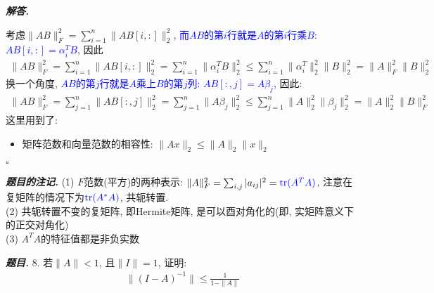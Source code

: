 \documentclass[10pt, a4paper, oneside]{ctexart}
\newcommand{\norm}[1]{\| #1 \|}
\newenvironment{problem}{\begin{framed}\par\noindent\textbf{\textit{题目. }}}{\end{framed}\par}
\newenvironment{solution}{%
  \par\noindent\textbf{\textit{解答. }}\ignorespaces
}{%
  \hfill\ensuremath{\square}\par %
}
\newenvironment{note}{\par\noindent\textbf{\textit{题目的注记. }}\ignorespaces}{\par}
\begin{document}
\begin{solution}
考虑$\norm{AB}_F^2=\sum_{i=1}^n \norm{AB[i,:]}_2^2$, \textcolor{blue}{而$AB$的第$i$行就是$A$的第$i$行乘$B$: $AB[i,:]=\alpha_i^TB$}, 因此
\begin{align*}
    \norm{AB}_F^2=\sum_{i=1}^n \norm{AB[i,:]}_2^2=\sum_{i=1}^n \norm{\alpha_i^TB}_2^2\leq \sum_{i=1}^n \norm{\alpha_i^T}_2^2\norm{B}_2^2=\norm{A}_F^2\norm{B}_2^2
\end{align*}
换一个角度, \textcolor{blue}{$AB$的第$j$行就是$A$乘上$B$的第$j$列: $AB[:,j]=A\beta_j$}, 因此:
\begin{align*}
    \norm{AB}_F^2=\sum_{j=1}^n \norm{AB[:,j]}_2^2=\sum_{j=1}^n \norm{A\beta_j}_2^2\leq \sum_{j=1}^n \norm{A}_2^2\norm{\beta_j}_2^2=\norm{A}_2^2\norm{B}_F^2
\end{align*}
这里用到了:
\begin{itemize}
    \item 矩阵范数和向量范数的相容性: $\norm{Ax}_2\leq \norm{A}_2\norm{x}_2$
\end{itemize}
\end{solution}

\begin{note}
(1) $F$范数(平方)的两种表示: $\norm{A}_F^2=\sum_{i,j}|a_{ij}|^2=\textcolor{blue}{\text{tr}(A^TA) }$, 注意在复矩阵的情况下为$\textcolor{blue}{\text{tr}(A^*A)}$, 共轭转置.\\
(2) 共轭转置不变的复矩阵, 即Hermite矩阵, 是可以酉对角化的(即, 实矩阵意义下的正交对角化)\\
(3) $A^TA$的特征值都是非负实数
\end{note}

\begin{problem}
    8. 若$\norm{A}<1$, 且$\norm{I}=1$, 证明:
    \begin{align*}
        \norm{(I-A)^{-1}}\leq \frac{1}{1-\norm{A}}
    \end{align*}
\end{problem}
\end{document}

